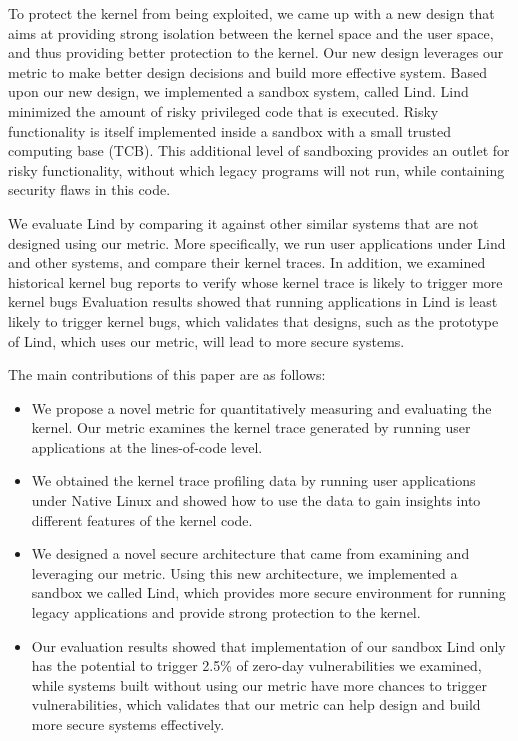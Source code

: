 To protect the kernel from being exploited, we came up with a new design 
that aims at providing strong isolation between the kernel space and the user space, 
and thus providing better protection to the kernel. Our new design leverages 
our metric to make better design decisions and build more effective system. 
Based upon our new design, we implemented a sandbox system, called Lind.
Lind minimized the amount of risky privileged code that is executed.  
Risky functionality is itself implemented inside a sandbox with
a small trusted computing base (TCB). 
This additional level of sandboxing provides an outlet for risky functionality, without which
legacy programs will not run, while containing security flaws in this code. 

We evaluate Lind by comparing it against other similar systems 
that are not designed using our metric. More specifically, we run user applications
under Lind and other systems, and compare their kernel traces. In addition, we examined historical
kernel bug reports to verify whose kernel trace is likely to trigger more kernel bugs
Evaluation results showed that running applications in Lind is least likely to trigger kernel bugs, 
which validates that designs, such as the prototype of Lind, which uses our metric, 
will lead to more secure systems. 

The main contributions of this paper are as follows:

\begin{itemize}
\item We propose a novel metric for quantitatively measuring and evaluating the kernel. 
Our metric examines the kernel trace generated by running user applications at the lines-of-code level.  

\item We obtained the kernel trace profiling data by running user applications under Native Linux and 
showed how to use the data to gain insights into different features of the kernel code.

\item We designed a novel secure architecture that came from examining and leveraging our metric. 
Using this new architecture, we implemented a sandbox we called Lind, which provides more secure environment
for running legacy applications and provide strong protection to the kernel. 

\item Our evaluation results showed that implementation of our sandbox Lind only has the potential to 
trigger 2.5\% of zero-day vulnerabilities we examined, 
while systems built without using our metric have more chances to trigger vulnerabilities, which validates 
that our metric can help design and build more secure systems effectively.
\end{itemize}

